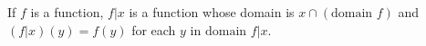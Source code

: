 If $f$ is a function, $f|x$ is a function whose domain is $x \cap (\text{domain } f)$ and $(f|x)(y) = f(y)$ for each $y$ in $\text{domain } f|x$.
